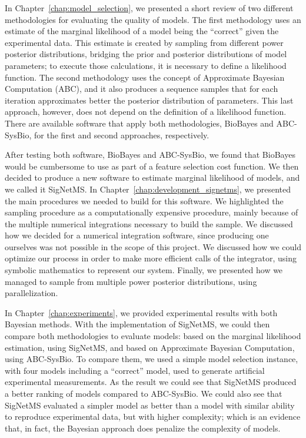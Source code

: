 In Chapter~\ref{chap:model_selection}, we presented a short review of two different methodologies
for evaluating the quality of models. The first methodology uses an
estimate of the marginal likelihood of a model being the ``correct''
given the experimental data. This estimate is created by sampling from
different power posterior distributions, bridging the prior and
posterior distributions of model parameters; to execute those
calculations, it is necessary to define a likelihood function. The 
second methodology uses the concept of Approximate Bayesian 
Computation (ABC), and it also produces a sequence samples that for each
iteration approximates better the posterior distribution of parameters.
This last approach, however, does not depend on the definition of a
likelihood function. There are available software that apply both
methodologies, BioBayes and ABC-SysBio, for the first and second
approaches, respectively.

After testing both software, BioBayes and ABC-SysBio, we found that
BioBayes would be cumbersome to use as part of a feature selection cost
function. We then decided to produce a new software to estimate marginal
likelihood of models, and we called it SigNetMS. In Chapter~\ref{chap:development_signetms}, we
presented the main procedures we needed to build for this software. We
highlighted the sampling procedure as a computationally expensive
procedure, mainly because of the multiple numerical integrations
necessary to build the sample. We discussed how we decided for a
numerical integration software, since producing one ourselves was not
possible in the scope of this project. We discussed how we could
optimize our process in order to make more efficient calls of the
integrator, using symbolic mathematics to represent our system. Finally,
we presented how we managed to sample from multiple power posterior
distributions, using parallelization.

In Chapter~\ref{chap:experiments}, we provided experimental results with both Bayesian methods.
With the implementation of SigNetMS, we could then compare both
methodologies to evaluate models: based on the marginal likelihood
estimation, using SigNetMS, and based on Approximate Bayesian
Computation, using ABC-SysBio. To compare them, we used a simple model
selection instance, with four models including a ``correct'' model, used
to generate artificial experimental measurements. As the result we
could see that SigNetMS produced a better ranking of models compared to
ABC-SysBio. We could also see that SigNetMS evaluated a simpler model as
better than a model with similar ability to reproduce experimental data,
but with higher complexity; which is an evidence that, in fact, the
Bayesian approach does penalize the complexity of models.

